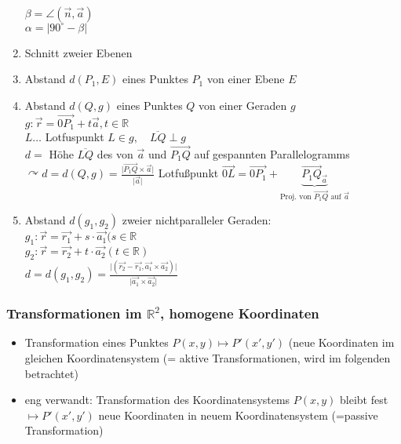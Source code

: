 \documentclass[a4paper]{scrartcl}
\begin{document}
\begin{enumerate}
\\
$\beta = \angle (\vec{n},\vec{a})$\\
$\alpha = \lvert 90^{\circ} - \beta \rvert$\\
\item Schnitt zweier Ebenen
\item Abstand $d(P_1,E)$ eines Punktes $P_1$ von einer Ebene $E$
\item Abstand $d(Q,g)$ eines Punktes $Q$ von einer Geraden $g$ \
$g: \vec{r} = \overrightarrow{0P_1} + t \vec{a}, t \in \mathbb{R}$\\
$L \dots $ Lotfuspunkt $ L \in g, \quad \overline{LQ} \perp g$\\
$d=$ Höhe $\overline{LQ}$ des von $\vec{a}$ und $\overrightarrow{P_1Q}$ auf gespannten Parallelogramms\\
$\curvearrowright d=d(Q,g) = \frac{\lvert \overrightarrow{P_1Q} \times \vec{a} \rvert}{\lvert \vec{a} \rvert }$ Lotfußpunkt $\overrightarrow{0L} = \overrightarrow{0P_1} + \underbrace{\overrightarrow{P_1Q}_{\vec{a}}}_{\text{Proj. von } \overrightarrow{P_1Q} \text{ auf } \vec{a}}$
\item Abstand $d(g_1,g_2)$ zweier nichtparalleler Geraden:\\
$g_1 : \vec{r} = \vec{r_1} + s \cdot \vec{a_1} (s\in \mathbb{R}$\\
$g_2 : \vec{r} = \vec{r_2} + t \cdot \vec{a_2} (t \in \mathbb{R} )$\\
$d=d(g_1,g_2) = \frac{\lvert ( \vec{r_2} - \vec{r_1} , \vec{a_1} \times \vec{a_2} ) \rvert }{\lvert \vec{a_1} \times \vec{a_2} \rvert }$
\end{enumerate}

\subsubsection{Transformationen im $\mathbb{R}^2$, homogene Koordinaten}
\begin{itemize}
\item Transformation eines Punktes $P(x,y) \mapsto P' (x',y')$ (neue Koordinaten im gleichen Koordinatensystem (= aktive Transformationen, wird im folgenden betrachtet)
\item eng verwandt: Transformation des Koordinatensystems $P(x,y)$ bleibt fest $\mapsto P'(x',y')$ neue Koordinaten in neuem Koordinatensystem (=passive Transformation)
\end{itemize}
\end{document}
